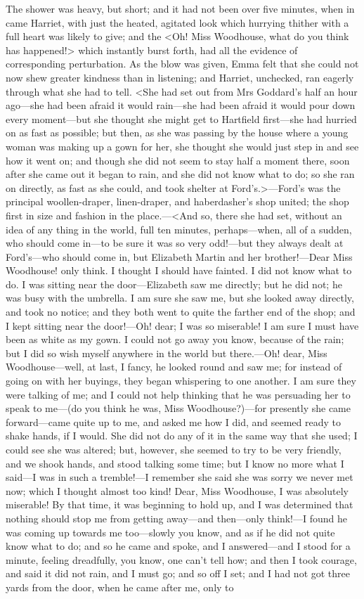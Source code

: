 The shower was heavy, but short; and it had not been over five minutes, when in came Harriet, with just the heated, agitated look which hurrying thither with a full heart was likely to give; and the <Oh! Miss Woodhouse, what do you think has happened!> which instantly burst forth, had all the evidence of corresponding perturbation. As the blow was given, Emma felt that she could not now shew greater kindness than in listening; and Harriet, unchecked, ran eagerly through what she had to tell. <She had set out from Mrs Goddard's half an hour ago—she had been afraid it would rain—she had been afraid it would pour down every moment—but she thought she might get to Hartfield first—she had hurried on as fast as possible; but then, as she was passing by the house where a young woman was making up a gown for her, she thought she would just step in and see how it went on; and though she did not seem to stay half a moment there, soon after she came out it began to rain, and she did not know what to do; so she ran on directly, as fast as she could, and took shelter at Ford's.>—Ford's was the principal woollen-draper, linen-draper, and haberdasher's shop united; the shop first in size and fashion in the place.—<And so, there she had set, without an idea of any thing in the world, full ten minutes, perhaps—when, all of a sudden, who should come in—to be sure it was so very odd!—but they always dealt at Ford's—who should come in, but Elizabeth Martin and her brother!—Dear Miss Woodhouse! only think. I thought I should have fainted. I did not know what to do. I was sitting near the door—Elizabeth saw me directly; but he did not; he was busy with the umbrella. I am sure she saw me, but she looked away directly, and took no notice; and they both went to quite the farther end of the shop; and I kept sitting near the door!—Oh! dear; I was so miserable! I am sure I must have been as white as my gown. I could not go away you know, because of the rain; but I did so wish myself anywhere in the world but there.—Oh! dear, Miss Woodhouse—well, at last, I fancy, he looked round and saw me; for instead of going on with her buyings, they began whispering to one another. I am sure they were talking of me; and I could not help thinking that he was persuading her to speak to me—(do you think he was, Miss Woodhouse?)—for presently she came forward—came quite up to me, and asked me how I did, and seemed ready to shake hands, if I would. She did not do any of it in the same way that she used; I could see she was altered; but, however, she seemed to try to be very friendly, and we shook hands, and stood talking some time; but I know no more what I said—I was in such a tremble!—I remember she said she was sorry we never met now; which I thought almost too kind! Dear, Miss Woodhouse, I was absolutely miserable! By that time, it was beginning to hold up, and I was determined that nothing should stop me from getting away—and then—only think!—I found he was coming up towards me too—slowly you know, and as if he did not quite know what to do; and so he came and spoke, and I answered—and I stood for a minute, feeling dreadfully, you know, one can't tell how; and then I took courage, and said it did not rain, and I must go; and so off I set; and I had not got three yards from the door, when he came after me, only to 
